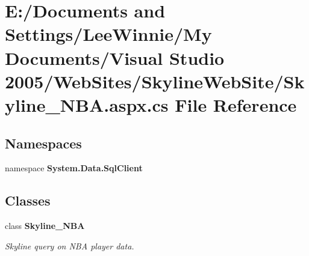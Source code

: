 \section{E:/Documents and Settings/Lee\-Winnie/My Documents/Visual Studio 2005/Web\-Sites/Skyline\-Web\-Site/Skyline\_\-NBA.aspx.cs File Reference}
\label{_skyline___n_b_a_8aspx_8cs}
\subsection*{Namespaces}
\begin{CompactItemize}
\item 
namespace {\bf System.Data.Sql\-Client}
\end{CompactItemize}
\subsection*{Classes}
\begin{CompactItemize}
\item 
class {\bf Skyline\_\-NBA}
\begin{CompactList}\small\item\em Skyline query on NBA player data. \item\end{CompactList}\end{CompactItemize}

